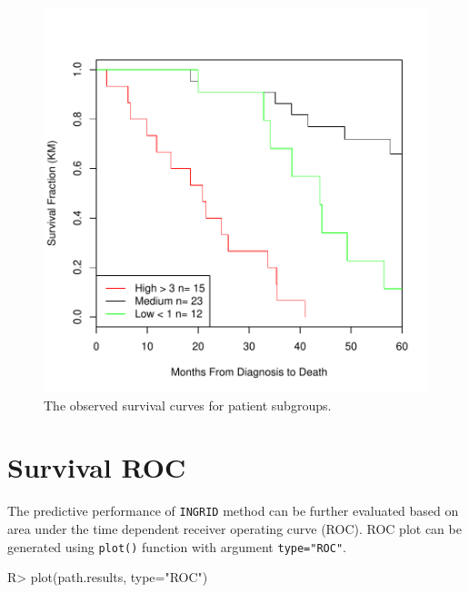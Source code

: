 \documentclass[11pt]{article}
\begin{document}
\begin{figure}[tbh]
\begin{center}
\includegraphics{INGRID-example-plot}
\caption{The observed survival curves for patient subgroups.}
\end{center}
\end{figure}

\section{Survival ROC}

The predictive performance of \texttt{INGRID} method can be further evaluated based on area under the time dependent receiver operating curve (ROC).
ROC plot can be generated using \texttt{plot()} function with argument \texttt{type="{}ROC"{}}.
\begin{Schunk}
\begin{Sinput}
R> plot(path.results, type="ROC")
\end{Sinput}
\end{Schunk}
\end{document}
